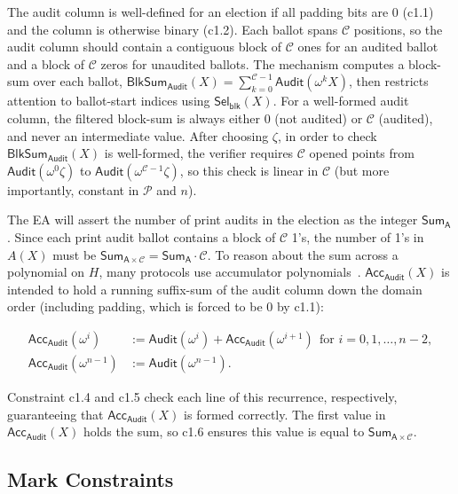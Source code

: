  The audit column is well-defined for an election if all padding bits are 0 (c1.1) and the column is otherwise binary (c1.2). Each ballot spans $\mathcal{C}$ positions, so the audit column should contain a contiguous block of $\mathcal{C}$ ones for an audited ballot and a block of $\mathcal{C}$ zeros for unaudited ballots. The mechanism computes a block-sum over each ballot, $\mathsf{BlkSum}_{\mathsf{Audit}}(X)=\sum_{k=0}^{\mathcal{C}-1}\mathsf{Audit}(\omega^k X)$, then restricts attention to ballot-start indices using $\mathsf{Sel}_{\mathsf{blk}}(X)$. For a well-formed audit column, the filtered block-sum is always either $0$ (not audited) or $\mathcal{C}$ (audited), and never an intermediate value. After choosing $\zeta$, in order to check $\mathsf{BlkSum}_{\mathsf{Audit}}(X)$ is well-formed, the verifier requires $\mathcal{C}$ opened points from $\mathsf{Audit}(\omega^0\zeta)$ to $\mathsf{Audit}(\omega^{\mathcal{C}-1}\zeta)$, so this check is linear in $\mathcal{C}$ (but more importantly, constant in $\mathcal{P}$ and $n$).

The EA will assert the number of print audits in the election as the integer $\mathsf{Sum}_\mathsf{A}$. Since each print audit ballot contains a block of $\mathcal{C}$ 1's, the number of 1's in $A(X)$ must be $\mathsf{Sum}_{\mathsf{A}\times\mathcal{C}}=\mathsf{Sum}_\mathsf{A}\cdot\mathcal{C}$. To reason about the sum across a polynomial on $H$, many protocols use accumulator polynomials~\cite{GWC19,BFGW19}. $\mathsf{Acc}_{\mathsf{Audit}}(X)$ is intended to hold a running suffix-sum of the audit column down the domain order (including padding, which is forced to be $0$ by c1.1):

$$
\begin{aligned}
\mathsf{Acc}_{\mathsf{Audit}}(\omega^{i}) &:= \mathsf{Audit}(\omega^{i}) + \mathsf{Acc}_{\mathsf{Audit}}(\omega^{i+1}) \ \ \text{for } i=0,1,\ldots,n-2,\\
\mathsf{Acc}_{\mathsf{Audit}}(\omega^{n-1}) &:= \mathsf{Audit}(\omega^{n-1}).
\end{aligned}
$$

 Constraint c1.4 and c1.5 check each line of this recurrence, respectively, guaranteeing that $\mathsf{Acc}_{\mathsf{Audit}}(X)$ is formed correctly. The first value in $\mathsf{Acc}_{\mathsf{Audit}}(X)$ holds the sum, so c1.6 ensures this value is equal to $\mathsf{Sum}_{\mathsf{A}\times\mathcal{C}}$.


\subsection{Mark Constraints}
\label{sec:mark}

